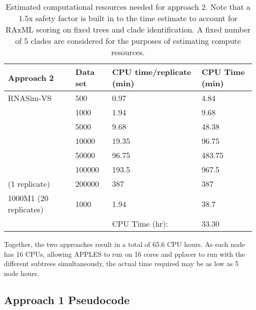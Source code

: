 \documentclass[11pt]{article}
\begin{document}
\begin{table}[h]
\centering
\begin{tabular}{llll}
\hline
Approach 2             & Data set & CPU time/replicate (min) & CPU Time (min) \\ \hline
RNASim-VS              & 500      & 0.97                   & 4.84         \\
                       & 1000     & 1.94                    & 9.68          \\
                       & 5000     & 9.68                    & 48.38         \\
                       & 10000    & 19.35                    & 96.75          \\
                       & 50000    & 96.75                    & 483.75         \\
                       & 100000   & 193.5                    & 967.5          \\
        (1 replicate)  & 200000   & 387                      & 387            \\
1000M1 (20 replicates) & 1000     & 1.94                    & 38.7           \\
                       &          & CPU Time (hr):           & 33.30      \\ \hline
\end{tabular}
\caption{
  Estimated computational resources needed for approach 2.
  Note that a 1.5x safety factor is built in to the time estimate
  to account for RAxML scoring on fixed trees and clade identification.
  A fixed number of 5 clades are considered for the purposes
  of estimating compute resources.
  }

\label{table:approach2-compute}
\end{table}

Together, the two approaches result in a total of 65.6 CPU hours. As
each node has 16 CPUs, allowing APPLES to run on 16 cores and pplacer to
run with the different subtrees simultaneously, the actual time required
may be as low as 5 node hours.

\subsection{Approach 1 Pseudocode}
\end{document}
